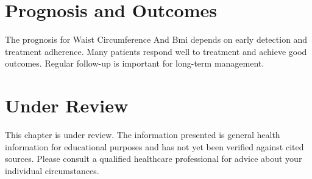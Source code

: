 \section*{Prognosis and Outcomes}
The prognosis for Waist Circumference And Bmi depends on early detection and treatment adherence. Many patients respond well to treatment and achieve good outcomes. Regular follow-up is important for long-term management.
\section*{Under Review}
This chapter is under review. The information presented is general health information for educational purposes and has not yet been verified against cited sources. Please consult a qualified healthcare professional for advice about your individual circumstances.


\clearpage
